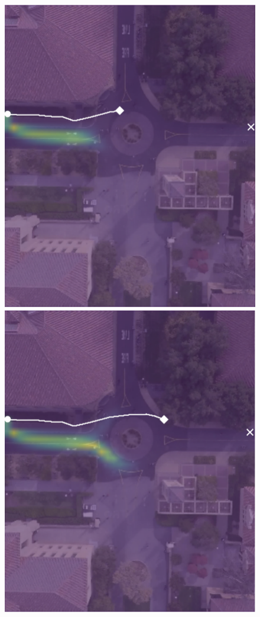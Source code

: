 \documentclass[letterpaper,10pt,conference]{ieeeconf}
\begin{document}
\begin{figure}
\begin{minipage}[t]{0.3\linewidth}
		\includegraphics[width=\linewidth]{./figures/comparison/kit_death_1_2_t=250.png}
	\end{minipage}
	\begin{minipage}[t]{0.3\linewidth}
		\includegraphics[width=\linewidth]{./figures/comparison/kit_death_1_2_t=370.png}
	\end{minipage}
	

\end{figure}
\end{document}

